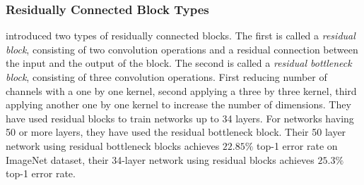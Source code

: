 \subsubsection{Residually Connected Block Types}
\cite{He:2015aa} introduced two types of residually connected blocks. The first is called a \textit{residual block}, consisting of two convolution operations and a residual connection between the input and the output of the block. The second is called a \textit{residual bottleneck block}, consisting of three convolution operations. First reducing number of channels with a one by one kernel, second applying a three by three kernel, third applying another one by one kernel to increase the number of dimensions. They have used residual blocks to train networks up to 34 layers. For networks having 50 or more layers, they have used the residual bottleneck block. Their 50 layer network using residual bottleneck blocks achieves $22.85\%$ top-1 error rate on ImageNet dataset, their 34-layer network using residual blocks achieves $25.3\%$ top-1 error rate.
